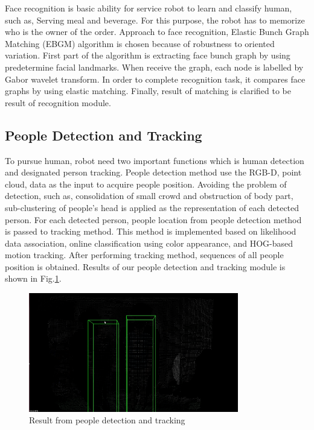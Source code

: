 \documentclass{llncs}
\begin{document}
Face recognition is basic ability for service robot to learn and classify human, such as, Serving meal and beverage. For this purpose, the robot has to memorize who is the owner of the order. Approach to face recognition, Elastic Bunch Graph Matching (EBGM) algorithm is chosen because of robustness to oriented variation\cite{face_reg}. First part of the algorithm is extracting face bunch graph by using predetermine facial landmarks. When receive the graph, each node is labelled by Gabor wavelet transform. In order to complete recognition task, it compares face graphs by using elastic matching. Finally, result of matching is clarified to be result of recognition module.

\subsection{People Detection and Tracking}

To pursue human, robot need two important functions which is human detection and designated person tracking. People detection method use the RGB-D, point cloud, data as the input to acquire people position. Avoiding the problem of detection, such as, consolidation of small crowd and obstruction of body part, sub-clustering of people's head is applied as the representation of each detected person. For each detected person, people location from people detection method is passed to tracking method. This method is implemented based on likelihood data association, online classification using color appearance, and HOG-based motion tracking\cite{pp_detect}. After performing tracking method, sequences of all people position is obtained. Results of our people detection and tracking module is shown in Fig.\ref{fig:people_detection}.

\begin{figure}
\centering
\includegraphics[height=5.2cm]{people_detection_figure}
\caption{Result from people detection and tracking}
\label{fig:people_detection}
\end{figure}
\end{document}
